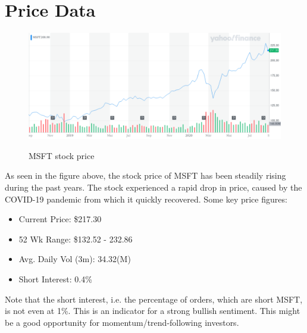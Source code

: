 \documentclass[]{article}
\begin{document}
	\section{Price Data}
	\begin{figure}[h]
		\centering
		\includegraphics[scale=0.35]{"MSFT_YahooFinanceChart.png"}
		\caption{MSFT stock price}
		\cite{yahoo!finance_2020}
		\label{fig:meine-grafik}
	\end{figure}
	\noindent As seen in the figure above, the stock price of MSFT has been steadily rising during the past years. The stock experienced a rapid drop in price, caused by the COVID-19 pandemic from which it quickly recovered. Some key price figures:
	\begin{itemize}
		\item Current Price: \$217.30
		\item 52 Wk Range: \$132.52 - 232.86
		\item Avg. Daily Vol (3m): 34.32(M)
		\item Short Interest: 0.4\%
	\end{itemize}
	\noindent Note that the short interest, i.e. the percentage of orders, which are short MSFT, is not even at 1\%. This is an indicator for a strong bullish sentiment. This might be a good opportunity for momentum/trend-following investors.
\end{document}
